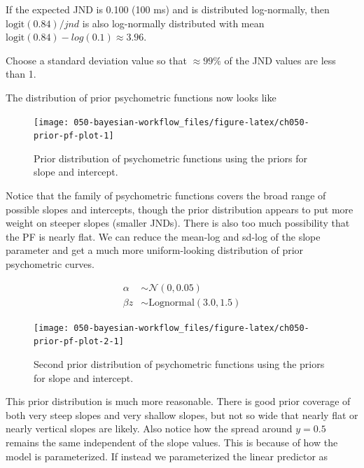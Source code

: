 \documentclass[11pt, oneside, openany]{scrbook}
\begin{document}
If the expected JND is 0.100 (100 ms) and is distributed log-normally, then \(\mathrm{logit}(0.84)/jnd\) is also log-normally distributed with mean \(\mathrm{logit}(0.84) - log(0.1) \approx 3.96\).

Choose a standard deviation value so that \(\approx 99\%\) of the JND values are less than 1.

The distribution of prior psychometric functions now looks like

\begin{figure}

{\centering \texttt{[image: 050-bayesian-workflow\_files/figure-latex/ch050-prior-pf-plot-1]} 

}

\caption{Prior distribution of psychometric functions using the priors for slope and intercept.}\label{fig:ch050-prior-pf-plot}
\end{figure}

Notice that the family of psychometric functions covers the broad range of possible slopes and intercepts, though the prior distribution appears to put more weight on steeper slopes (smaller JNDs). There is also too much possibility that the PF is nearly flat. We can reduce the mean-log and sd-log of the slope parameter and get a much more uniform-looking distribution of prior psychometric curves.

\begin{align*}
\alpha &\sim \mathcal{N}(0, 0.05) \\
\beta  z&\sim \mathrm{Lognormal}(3.0, 1.5)
\end{align*}

\begin{figure}

{\centering \texttt{[image: 050-bayesian-workflow\_files/figure-latex/ch050-prior-pf-plot-2-1]} 

}

\caption{Second prior distribution of psychometric functions using the priors for slope and intercept.}\label{fig:ch050-prior-pf-plot-2}
\end{figure}

This prior distribution is much more reasonable. There is good prior coverage of both very steep slopes and very shallow slopes, but not so wide that nearly flat or nearly vertical slopes are likely. Also notice how the spread around \(y=0.5\) remains the same independent of the slope values. This is because of how the model is parameterized. If instead we parameterized the linear predictor as
\end{document}
